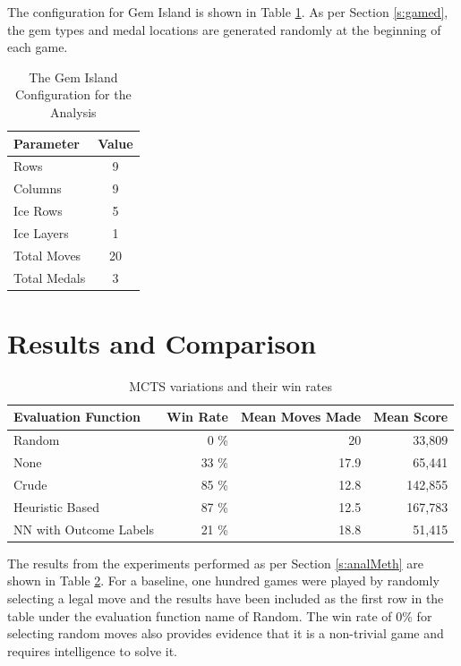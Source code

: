 \documentclass{bhamthesis}
\theoremstyle{definition}
\begin{document}
The configuration for Gem Island is shown in Table \ref{t:analysisConfig}. As per Section \ref{s:gamed}, the gem types and medal locations are generated randomly at the beginning of each game. 

\begin{table}[]
	\centering
	\caption{The Gem Island Configuration for the Analysis}
	\label{t:analysisConfig}
	\begin{tabular}{lc}
		\hline
		Parameter    & Value \\ \hline
		Rows         & 9     \\
		Columns      & 9     \\
		Ice Rows      & 5     \\
		Ice Layers   & 1     \\
		Total Moves  & 20    \\
		Total Medals & 3    
	\end{tabular}
\end{table}


\section{Results and Comparison}\label{s:resultsC}

\begin{table}[]
	\centering
	\caption{MCTS variations and their win rates}
	\label{t:MCTSWinRates}
	\begin{tabular}{lrrr}
		\hline
		Evaluation Function    & Win Rate & Mean Moves Made & Mean Score \\ \hline
		Random                 & 0 \%     & 20              & 33,809     \\
		None                   & 33 \%    & 17.9            & 65,441     \\
		Crude                  & 85 \%    & 12.8            & 142,855    \\
		Heuristic Based        & 87 \%    & 12.5            & 167,783    \\
		NN with Outcome Labels & 21 \%    & 18.8            & 51,415    
	\end{tabular}
\end{table}

The results from the experiments performed as per Section \ref{s:analMeth} are shown in Table \ref{t:MCTSWinRates}. For a baseline, one hundred games were played by randomly selecting a legal move and the results have been included as the first row in the table under the evaluation function name of Random. The win rate of 0\% for selecting random moves also provides evidence that it is a non-trivial game and requires intelligence to solve it.
\end{document}
